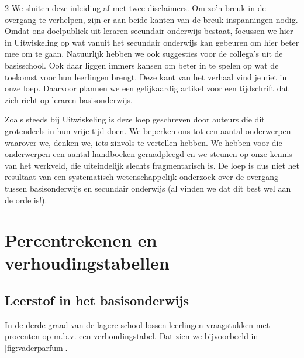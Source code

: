 \begin{multicols}{2}
We sluiten deze inleiding af met twee disclaimers.
Om zo'n breuk in de overgang te verhelpen, zijn er aan beide kanten van de breuk inspanningen nodig.
Omdat ons doelpubliek uit leraren secundair onderwijs bestaat, focussen we hier in Uitwiskeling op wat vanuit het secundair onderwijs kan gebeuren om hier beter mee om te gaan.
Natuurlijk hebben we ook suggesties voor de collega's uit de basisschool.
Ook daar liggen immers kansen om beter in te spelen op wat de toekomst voor hun leerlingen brengt.
Deze kant van het verhaal vind je niet in onze loep.
Daarvoor plannen we een gelijkaardig artikel voor een tijdschrift dat zich richt op leraren basisonderwijs.

Zoals steeds bij Uitwiskeling is deze loep geschreven door auteurs die dit grotendeels in hun vrije tijd doen.
We beperken ons tot een aantal onderwerpen waarover we, denken we, iets zinvols te vertellen hebben.
We hebben voor die onderwerpen een aantal handboeken geraadpleegd en we steunen op onze kennis van het werkveld, die uiteindelijk slechts fragmentarisch is.
De loep is dus niet het resultaat van een systematisch wetenschappelijk onderzoek over de overgang tussen basisonderwijs en secundair onderwijs (al vinden we dat dit best wel aan de orde is!).

\section{Percentrekenen en verhoudingstabellen}\label{percent}

\subsection{Leerstof in het basisonderwijs}

In de derde graad van de lagere school lossen leerlingen vraagstukken met procenten op m.b.v. een verhoudingstabel.
Dat zien we bijvoorbeeld in \autoref{fig:vaderparfum}.
\end{multicols}


